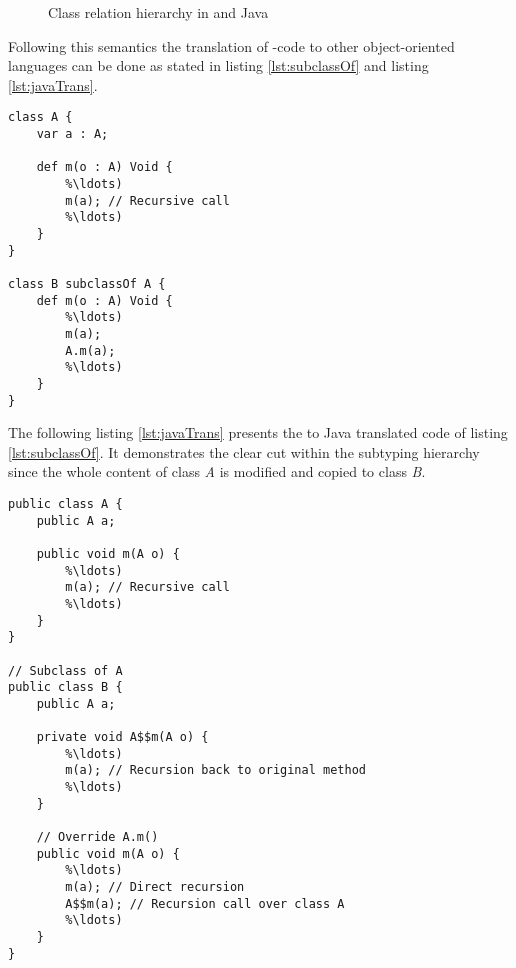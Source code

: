\begin{figure}[h]
	\centering
	\caption{Class relation hierarchy in \ooplss and Java}
	\label{fig:inheritHierarchy}
\end{figure}


Following this semantics the translation of \ooplss-code to
other object-oriented languages can be done as stated in listing
\ref{lst:subclassOf} and listing \ref{lst:javaTrans}.

\begin{lstlisting}[float,language=ooplss,caption=Subtyping in \ooplss,label=lst:subclassOf]
class A {
	var a : A;

	def m(o : A) Void {
		%\ldots)
		m(a); // Recursive call
		%\ldots)
	}
}

class B subclassOf A {
	def m(o : A) Void {
		%\ldots)
		m(a);
		A.m(a);
		%\ldots)
	}
}
\end{lstlisting}

The following listing \ref{lst:javaTrans} presents the to Java translated
code of listing \ref{lst:subclassOf}. It demonstrates the clear cut within 
the subtyping hierarchy since the whole content of class \emph{A} is modified
and copied to class \emph{B}.

\begin{lstlisting}[float,caption=Subtyping translated in Java,label=lst:javaTrans]
public class A {
	public A a;

	public void m(A o) {
		%\ldots)
		m(a); // Recursive call
		%\ldots)
	}
}

// Subclass of A
public class B {
	public A a;

	private void A$$m(A o) {
		%\ldots)
		m(a); // Recursion back to original method
		%\ldots)
	}

	// Override A.m()
	public void m(A o) {
		%\ldots)
		m(a); // Direct recursion
		A$$m(a); // Recursion call over class A
		%\ldots)
	}
}
\end{lstlisting}

